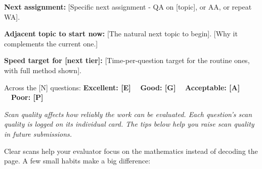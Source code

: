 \documentclass[11pt,a4paper]{article}
\begin{document}
\begin{tspoints}
    \item \textbf{Next assignment:} [Specific next assignment - QA on [topic], or AA, or repeat WA].
    \item \textbf{Adjacent topic to start now:} [The natural next topic to begin]. [Why it complements the current one.]
    \item \textbf{Speed target for [next tier]:} [Time-per-question target for the routine ones, with full method shown].
\end{tspoints}


\tsDisclaimer

\tsSignature


\newpage



Across the [N] questions: \textbf{\color{tsGreen}Excellent: [E]} \ \textperiodcentered\ \textbf{\color{tsBlue}Good: [G]} \ \textperiodcentered\ \textbf{\color{tsAmber}Acceptable: [A]} \ \textperiodcentered\ \textbf{\color{tsRed}Poor: [P]}

\par\vspace{0.1cm}
{\fontsize{9pt}{12pt}\selectfont\color{tsGrey}\textit{Scan quality affects how reliably the work can be evaluated. Each question's scan quality is logged on its individual card. The tips below help you raise scan quality in future submissions.}}


Clear scans help your evaluator focus on the mathematics instead of decoding the page. A few small habits make a big difference:
\end{document}
